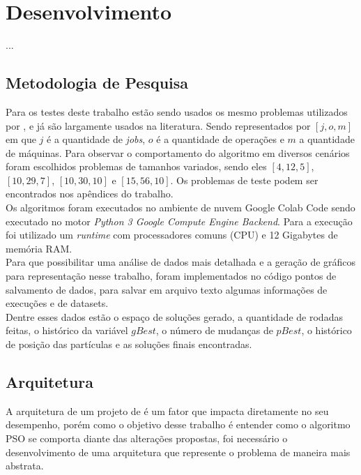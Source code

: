\chapter{Desenvolvimento}
    ...


\section{Metodologia de Pesquisa}
Para os testes deste trabalho estão sendo usados os mesmo problemas utilizados por \cite{Kacem2002}, e já são largamente usados na literatura. Sendo representados por $[j, o, m]$ em que $j$ é a quantidade de \textit{jobs}, $o$ é a quantidade de operações e $m$ a quantidade de máquinas. Para observar o comportamento do algoritmo em diversos cenários foram escolhidos problemas de tamanhos variados, sendo eles $[4, 12, 5]$, $[10, 29, 7]$, $[10, 30, 10]$ e $[15, 56, 10]$. Os problemas de teste podem ser encontrados nos apêndices do trabalho.\\
%
\indent Os algoritmos foram executados no ambiente de nuvem Google Colab Code sendo executado no motor \textit{Python 3 Google Compute Engine Backend}. Para a execução foi utilizado um \textit{runtime} com processadores comuns (CPU) e 12 Gigabytes de memória RAM.\\
%
%
\indent Para que possibilitar uma análise de dados mais detalhada e a geração de gráficos para representação nesse trabalho, foram implementados no código pontos de salvamento de dados, para salvar em arquivo texto algumas informações de execuções e de datasets.\\
\indent Dentre esses dados estão o espaço de soluções gerado, a quantidade de rodadas feitas, o histórico da variável $gBest$, o número de mudanças de $pBest$, o histórico de posição das partículas e as soluções finais encontradas.


\section{Arquitetura}
A arquitetura de um projeto de é um fator que impacta diretamente no seu desempenho, porém como o objetivo desse trabalho é entender como o algoritmo PSO se comporta diante das alterações propostas, foi necessário o desenvolvimento de uma arquitetura que represente o problema de maneira mais abstrata.

